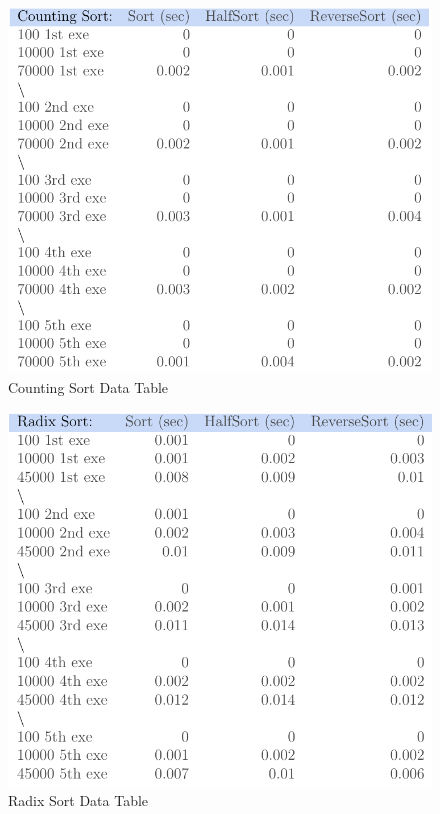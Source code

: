 \documentclass[12pt]{article}
\begin{document}
\begin{figure}[h]
	\centering
	\includegraphics[scale=.7]{CSdatatable.PNG}
	\caption{Counting Sort Data Table}
	\label{fig:mesh1}
\end{figure}
\begin{figure}[h]
	\centering
	\includegraphics[scale=.7]{RSdatatable.PNG}
	\caption{Radix Sort Data Table}
	\label{fig:mesh1}
\end{figure}
\end{document}

